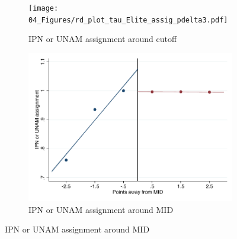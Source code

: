 \documentclass[oneside,11pt]{article}
\begin{document}
\begin{figure}[H]

    \caption{RD plots for treatment variables\label{fig:treat_rd_plot}}
    \begin{center}
    
    \begin{subfigure}{0.475\textwidth}
        \caption{IPN or UNAM assignment around cutoff}
        \centering
        \texttt{[image: 04\_Figures/rd\_plot\_tau\_Elite\_assig\_pdelta3.pdf]}
    \end{subfigure}
    \begin{subfigure}{0.475\textwidth}
        \caption{IPN or UNAM assignment around MID}
        \centering
        \includegraphics[width=\textwidth]{04_Figures/rd_plot_mid_Elite_assig_pdelta3.pdf}
    \end{subfigure}


\end{center}
\end{figure}
\end{document}
